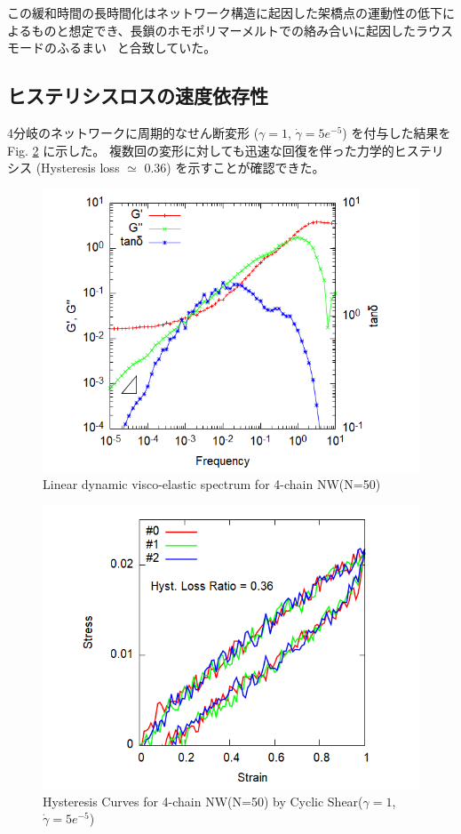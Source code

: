 \documentclass[uplatex,10pt,a4paper,twocolumn]{jsarticle}
\begin{document}
この緩和時間の長時間化はネットワーク構造に起因した架橋点の運動性の低下によるものと想定でき、長鎖のホモポリマーメルトでの絡み合いに起因したラウスモードのふるまい~\cite{kalathi} と合致していた。


\subsection{ヒステリシスロスの速度依存性}

4分岐のネットワークに周期的なせん断変形 ($\gamma = 1$, $\dot{\gamma} = 5e^{-5}$) を付与した結果を Fig. \ref{fig:hystloss} に示した。
複数回の変形に対しても迅速な回復を伴った力学的ヒステリシス (Hysteresis loss $\simeq$ 0.36) を示すことが確認できた。

\vspace{-3mm}
\begin{figure}[htb]
\centering
	\includegraphics[width=.47\textwidth]{gw_4chain_N50_stepstretch.png}
	\caption{Linear dynamic visco-elastic spectrum for 4-chain NW(N=50)}
	\label{fig:spectrum}
\end{figure}
\vspace{-5mm}

\vspace{-3mm}
\begin{figure}[htb]
\centering
	\includegraphics[width=.47\textwidth]{CyclicDeform_4chain_N50_rate5e-5.png}
	\caption{Hysteresis Curves for 4-chain NW(N=50) by Cyclic Shear($\gamma = 1$, $\dot{\gamma} = 5e^{-5}$)}
	\label{fig:hystloss}
\end{figure}
\vspace{-5mm}
\end{document}
